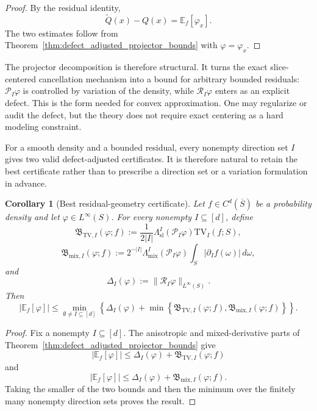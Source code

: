 \documentclass[11pt,letterpaper]{article}
\newtheorem{corollary}[theorem]{Corollary}
\theoremstyle{definition}
\theoremstyle{remark}
\newcommand{\TV}{\mathrm{TV}}
\begin{document}
\begin{proof}
By the residual identity,
$$
\widetilde Q(x)-Q(x)=\mathbb E_f[\varphi_x].
$$
The two estimates follow from
Theorem~\ref{thm:defect_adjusted_projector_bounds} with
$\varphi=\varphi_x$.
\end{proof}

The projector decomposition is therefore structural. It turns the exact
slice-centered cancellation mechanism into a bound for arbitrary bounded residuals:
$\mathcal P_I\varphi$ is controlled by variation of the density, while
$\mathcal R_I\varphi$ enters as an explicit defect. This is the form needed
for convex approximation. One may regularize or audit the defect, but the
theory does not require exact centering as a hard modeling constraint.

For a smooth density and a bounded residual, every nonempty direction set
$I$ gives two valid defect-adjusted certificates. It is therefore natural to
retain the best certificate rather than to prescribe a direction set or a
variation formulation in advance.

\begin{corollary}[Best residual-geometry certificate]
\label{cor:best_defect_adjusted_certificate}
Let $f\in C^d(\overline S)$ be a probability density and let
$\varphi\in L^\infty(S)$. For every nonempty $I\subseteq[d]$, define
$$
\mathfrak B_{\mathrm{TV},I}(\varphi;f)
:=
\frac{1}{2|I|}
\Lambda_{\mathrm{sl}}^I(\mathcal P_I\varphi)
\TV_I(f;S),
$$
$$
\mathfrak B_{\mathrm{mix},I}(\varphi;f)
:=
2^{-|I|}
\Lambda_{\mathrm{mix}}^I(\mathcal P_I\varphi)
\int_S|\partial_I f(\omega)|\,d\omega,
$$
and
$$
\Delta_I(\varphi)
:=
\|\mathcal R_I\varphi\|_{L^\infty(S)}.
$$
Then
\begin{equation}
\label{eq:best_defect_adjusted_certificate}
|\mathbb E_f[\varphi]|
\le
\min_{\emptyset\neq I\subseteq[d]}
\left\{
\Delta_I(\varphi)
+
\min\left
\{
\mathfrak B_{\mathrm{TV},I}(\varphi;f),
\mathfrak B_{\mathrm{mix},I}(\varphi;f)
\right\}
\right\}.
\end{equation}
\end{corollary}

\begin{proof}
Fix a nonempty $I\subseteq[d]$. The anisotropic and mixed-derivative parts of
Theorem~\ref{thm:defect_adjusted_projector_bounds} give
$$
|\mathbb E_f[\varphi]|
\le
\Delta_I(\varphi)+\mathfrak B_{\mathrm{TV},I}(\varphi;f)
$$
and
$$
|\mathbb E_f[\varphi]|
\le
\Delta_I(\varphi)+\mathfrak B_{\mathrm{mix},I}(\varphi;f).
$$
Taking the smaller of the two bounds and then the minimum over the finitely
many nonempty direction sets proves the result.
\end{proof}
\end{document}
